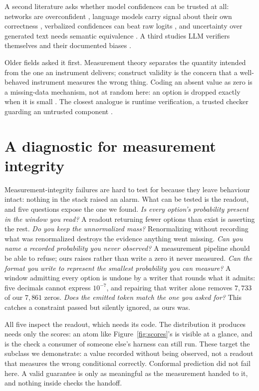 \documentclass{article}
\begin{document}
A second literature asks whether model confidences can be trusted at all:
networks are overconfident \citep{guo2017calibration}, language models carry
signal about their own correctness \citep{kadavath2022know}, verbalized
confidences can beat raw logits \citep{tian2023askcal}, and uncertainty over
generated text needs semantic equivalence \citep{kuhn2023semantic}. A third studies LLM verifiers themselves and their documented biases \citep{zheng2023judging,wang2024unfair}.

Older fields asked it first. Measurement theory separates the quantity
intended from the one an instrument delivers; construct validity \citep{cronbach1955construct} is the concern that a well-behaved instrument measures the wrong thing. Coding an absent value as zero is a missing-data mechanism, not at random
here: an option is dropped exactly when it is small
\citep{rubin1976inference}. The closest analogue is runtime verification, a trusted checker guarding an untrusted component \citep{sha2001simplex}.

\section{A diagnostic for measurement integrity}\label{sec:takeaway}
Measurement-integrity failures are hard to test for because they leave
behaviour intact: nothing in the stack raised an alarm. What can be tested is the
readout, and five questions expose the one we found.
\emph{Is every option's probability present in the window you read?} A
readout returning fewer options than exist is asserting the rest.
\emph{Do you keep the unnormalized mass?} Renormalizing without recording
what was renormalized destroys the evidence anything went missing.
\emph{Can you name a recorded probability you never observed?} A
measurement pipeline should be able to refuse; ours raises rather than write a
zero it never measured.
\emph{Can the format you write to represent the smallest probability you
can measure?} A window admitting every option is undone by a writer that rounds
what it admits: five decimals cannot express $10^{-7}$, and repairing that writer
alone removes $7{,}733$ of our $7{,}861$ zeros.
\emph{Does the emitted token match the one you asked for?} This catches a constraint passed but silently ignored, as ours was.

All five inspect the readout, which needs its code. The distribution it
produces needs only the scores: an atom like Figure~\ref{fig:scores}'s is visible
at a glance, and is the check a consumer of someone else's harness can still run.
These target the subclass we demonstrate: a value recorded without being
observed, not a readout that measures the wrong conditional correctly. Conformal prediction did not fail here. A valid guarantee is only as meaningful as the
measurement handed to it, and nothing inside checks the handoff.
\end{document}
